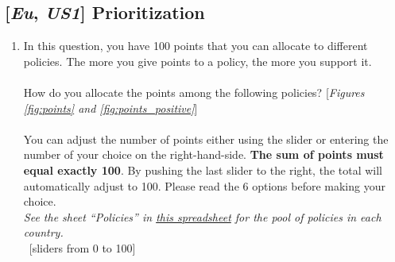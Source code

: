 \documentclass[12pt,english]{article}
\begin{document}
\subsection*{[\textit{Eu}, \textit{US1}] Prioritization}
\begin{enumerate}[resume] \item \label{q:points} In this question, you have 100 points that you can allocate to different policies. The more you give points to a policy, the more you support it.\\ 
   \\
    How do you allocate the points among the following policies? [\textit{Figures \ref{fig:points} and \ref{fig:points_positive}}]  \\
    \\
    You can adjust the number of points either using the slider or entering the number of your choice on the right-hand-side. \textbf{The sum of points must equal exactly 100}. By pushing the last slider to the right, the total will automatically adjust to 100. Please read the 6 options before making your choice.
    \\ \textit{See the sheet ``Policies'' in \href{https://github.com/bixiou/international_attitudes_toward_global_policies/raw/main/questionnaire/specificities.xlsx}{this spreadsheet} for the pool of policies in each country.}
\\ ~[sliders from 0 to 100]
\end{enumerate}
\end{document}
